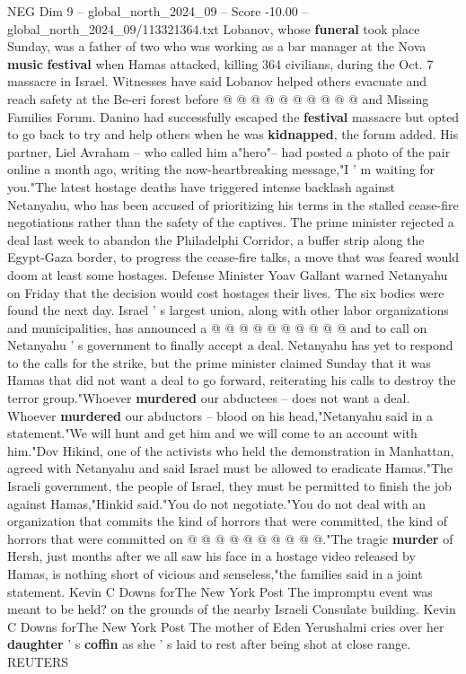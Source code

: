 \begin{textsample}{NEG Dim 9 – global\_north\_2024\_09 – Score -10.00 – global\_north\_2024\_09/113321364.txt}
Lobanov, whose \textbf{funeral} took place Sunday, was a father of two who was working as a bar manager at the Nova \textbf{music} \textbf{festival} when Hamas attacked, killing 364 civilians, during the Oct. 7 massacre in Israel.
Witnesses have said Lobanov helped others evacuate and reach safety at the Be-eri forest before @ @ @ @ @ @ @ @ @ @ and Missing Families Forum.
Danino had successfully escaped the \textbf{festival} massacre but opted to go back to try and help others when he was \textbf{kidnapped}, the forum added.
His partner, Liel Avraham -- who called him a"hero"-- had posted a photo of the pair online a month ago, writing the now-heartbreaking message,"I ' m waiting for you."The latest hostage deaths have triggered intense backlash against Netanyahu, who has been accused of prioritizing his terms in the stalled cease-fire negotiations rather than the safety of the captives.
The prime minister rejected a deal last week to abandon the Philadelphi Corridor, a buffer strip along the Egypt-Gaza border, to progress the cease-fire talks, a move that was feared would doom at least some hostages.
Defense Minister Yoav Gallant warned Netanyahu on Friday that the decision would cost hostages their lives.
The six bodies were found the next day.
Israel ' s largest union, along with other labor organizations and municipalities, has announced a @ @ @ @ @ @ @ @ @ @ and to call on Netanyahu ' s government to finally accept a deal.
Netanyahu has yet to respond to the calls for the strike, but the prime minister claimed Sunday that it was Hamas that did not want a deal to go forward, reiterating his calls to destroy the terror group."Whoever \textbf{murdered} our abductees -- does not want a deal.
Whoever \textbf{murdered} our abductors -- blood on his head,"Netanyahu said in a statement."We will hunt and get him and we will come to an account with him."Dov Hikind, one of the activists who held the demonstration in Manhattan, agreed with Netanyahu and said Israel must be allowed to eradicate Hamas."The Israeli government, the people of Israel, they must be permitted to finish the job against Hamas,"Hinkid said."You do not negotiate."You do not deal with an organization that commits the kind of horrors that were committed, the kind of horrors that were committed on @ @ @ @ @ @ @ @ @ @."The tragic \textbf{murder} of Hersh, just months after we all saw his face in a hostage video released by Hamas, is nothing short of vicious and senseless,"the families said in a joint statement.
Kevin C Downs forThe New York Post The impromptu event was meant to be held? on the grounds of the nearby Israeli Consulate building.
Kevin C Downs forThe New York Post The mother of Eden Yerushalmi cries over her \textbf{daughter} ' s \textbf{coffin} as she ' s laid to rest after being shot at close range.
REUTERS

\end{textsample}

